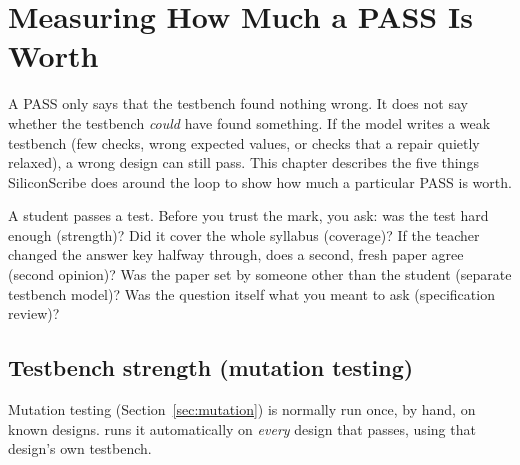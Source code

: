 \chapter{Measuring How Much a PASS Is Worth}
\label{ch:trust}

A PASS only says that the testbench found nothing wrong. It does not say whether the testbench \emph{could} have found something. If the model writes a weak testbench (few checks, wrong expected values, or checks that a repair quietly relaxed), a wrong design can still pass. This chapter describes the five things SiliconScribe does around the loop to show how much a particular PASS is worth.

\begin{analogy}
A student passes a test. Before you trust the mark, you ask: was the test hard enough (strength)? Did it cover the whole syllabus (coverage)? If the teacher changed the answer key halfway through, does a second, fresh paper agree (second opinion)? Was the paper set by someone other than the student (separate testbench model)? Was the question itself what you meant to ask (specification review)?
\end{analogy}

\section{Testbench strength (mutation testing)}
\label{sec:strength}

Mutation testing (Section~\ref{sec:mutation}) is normally run once, by hand, on known designs.  runs it automatically on \emph{every} design that passes, using that design's own testbench.

